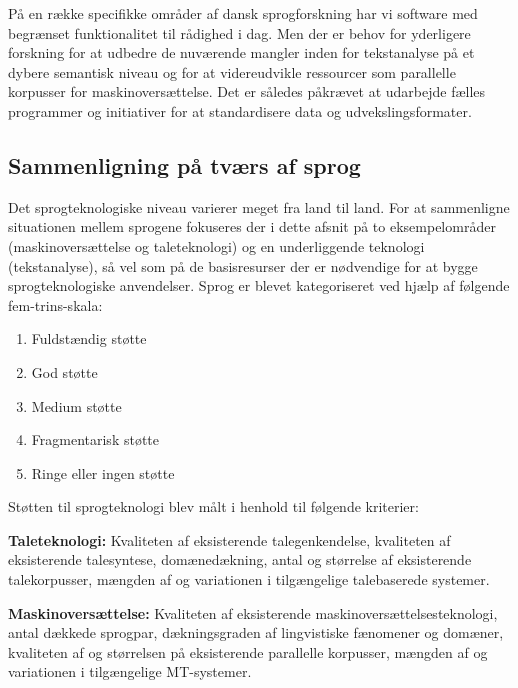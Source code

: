 \begin{multicols}{2}
\begin{itemize}
\end{itemize}
\mbox{P\aa}  en r\ae kke specifikke omr\aa der af dansk sprogforsk\-ning har vi software med begr\ae nset funktionalitet til r\aa dighed i dag. Men der er behov for yderligere forsk\-ning for at udbedre de nuv\ae rende  mangler inden for tekstanalyse \mbox{p\aa} et dybere semantisk niveau og for at videreudvikle ressourcer som parallelle korpusser for maskinoversættelse.
Det er s\aa ledes p\aa kr\ae vet at udarbej\-de f\ae lles programmer og initiativer for at standardisere data og udvekslingsformater. 

\subsection{Sammenligning på tv\ae rs af sprog}

Det sprogteknologiske niveau varierer meget fra land til land. For at sammenligne situationen mellem sprogene fokuseres der i dette afsnit \mbox{p\aa} to eksempelomr\aa der (maskinovers\ae ttelse og taleteknologi) og en underliggende teknologi (tekstanalyse), \mbox{s\aa} vel som \mbox{p\aa} de basisresurser der er n\o dvendige for at bygge sprogteknologiske anvendelser. Sprog er blevet kategoriseret ved hj\ae lp af f\o lgende fem-trins-skala:

\begin{enumerate}
\item Fuldst\ae ndig st\o tte
\item God st\o tte
\item Medium st\o tte
\item Fragmentarisk st\o tte
\item Ringe eller ingen st\o tte
\end{enumerate}

St\o tten til sprogteknologi blev m\aa lt i henhold til f\o lgende kriterier:

\textbf{Taleteknologi:} Kvaliteten af eksisterende talegenkendelse, kvaliteten af eksisterende talesyntese, dom\ae ned\ae kning, antal og st\o rrelse af eksisterende talekorpusser, m\ae ngden af og variationen i tilg\ae ngelige talebaserede systemer.

\textbf{Maskinovers\ae ttelse:} Kvaliteten af eksisterende maskinovers\ae ttelsesteknologi, antal d\ae kkede sprogpar, d\ae kningsgraden af lingvistiske f\ae nomener og dom\ae ner, kvaliteten af og st\o rrelsen \mbox{p\aa} eksisterende parallelle korpusser, m\ae ngden af og variationen i tilg\ae ngelige MT-systemer.



\end{multicols}
